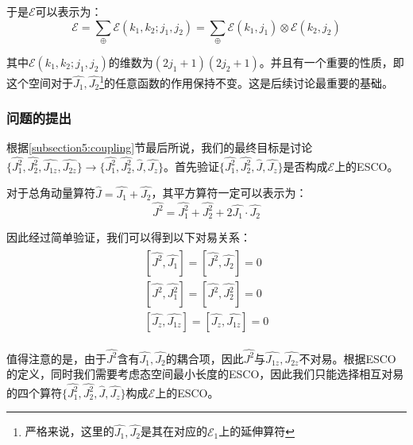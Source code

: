     于是$\mathcal{E}$可以表示为：
    \begin{equation}
        \mathcal{E}=\sum_{\oplus}\mathcal{E}(k_1,k_2;j_1,j_2)=\sum_{\oplus}\mathcal{E}(k_1,j_1)\otimes\mathcal{E}(k_2,j_2)
    \end{equation}
    
    其中$\mathcal{E}(k_1,k_2;j_1,j_2)$的维数为$(2j_1+1)(2j_2+1)$。并且有一个重要的性质，即这个空间对于$\hat{J_1},\hat{J_2}$\footnote{严格来说，这里的$\hat{J_1},\hat{J_2}$是其在对应的$\mathcal{E}_1$上的延伸算符}的任意函数的作用保持不变。这是后续讨论最重要的基础。
    \subsubsection{问题的提出}
    根据\ref{subsection5:coupling}节最后所说，我们的最终目标是讨论$\{\hat{J_1^2},\hat{J_2^2},\widehat{J_{1z}},\widehat{J_{2z}}\}\rightarrow \{\hat{J_1^2},\hat{J_2^2},\hat{J},\hat{J_z}\}$。首先验证$\{\hat{J_1^2},\hat{J_2^2},\hat{J},\hat{J_z}\}$是否构成$\mathcal{E}$上的ESCO。
    
    对于总角动量算符$\hat{J}=\hat{J_1}+\hat{J_2}$，其平方算符一定可以表示为：
    \begin{equation}
        \hat{J^2}=\hat{J_1^2}+\hat{J_2^2}+2\hat{J_1}\cdot\hat{J_2}
    \end{equation}
    
    因此经过简单验证，我们可以得到以下对易关系：
    \begin{align}\label{equ5:coupling_commutive}
        \begin{split}
            [\hat{J^2},\hat{J_1}]=[\hat{J^2},\hat{J_2}]=0\\
            [\hat{J^2},\hat{J_1^2}]=[\hat{J^2},\hat{J_2^2}]=0\\
            [\hat{J_z},\widehat{J_{1z}}]=[\hat{J_z},\widehat{J_{1z}}]=0
        \end{split}
    \end{align}
    
    值得注意的是，由于$\hat{J^2}\textrm{含有}\hat{J_1},\hat{J_2}$的耦合项，因此$\hat{J^2}\textrm{与}\widehat{J_{1z}},\widehat{J_{2z}}$不对易。根据ESCO的定义，同时我们需要考虑态空间最小长度的ESCO，因此我们只能选择相互对易的四个算符$\{\hat{J_1^2},\hat{J_2^2},\hat{J},\hat{J_z}\}$构成$\mathcal{E}$上的ESCO。
    
